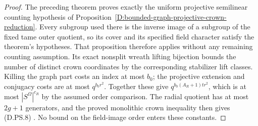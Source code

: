 \begin{proof}
The preceding theorem proves exactly the uniform projective
semilinear counting hypothesis of
Proposition~\ref{D:bounded-graph-projective-crown-reduction}.
Every subgroup used there is the inverse image of a subgroup
of the fixed tame outer quotient, so its cover and its
specified field character satisfy the theorem's hypotheses.
That proposition therefore applies without any remaining
counting assumption. Its exact nonsplit wreath lifting
bijection bounds the number of distinct crown coordinates
by the corresponding stabilizer lift classes. Killing the
graph part costs an index at most $b_0$; the projective
extension and conjugacy costs are at most $q^{b_0r^2}$.
Together these give $q^{b_0(A_R+1)tr^2}$, which is at most
$|S^\Omega|^{c_R}$ by the assumed order comparison.
The radial quotient has at most $2g+1$ generators, and the
proved monolithic crown inequality then gives (D.PS.8)
\citep[proof of Proposition2.6(ii), equations(2.1)--(2.2),
pp.~11--13]{LucchiniMarionTracey2020D}.
No bound on the field-image order enters these constants.
\end{proof}
